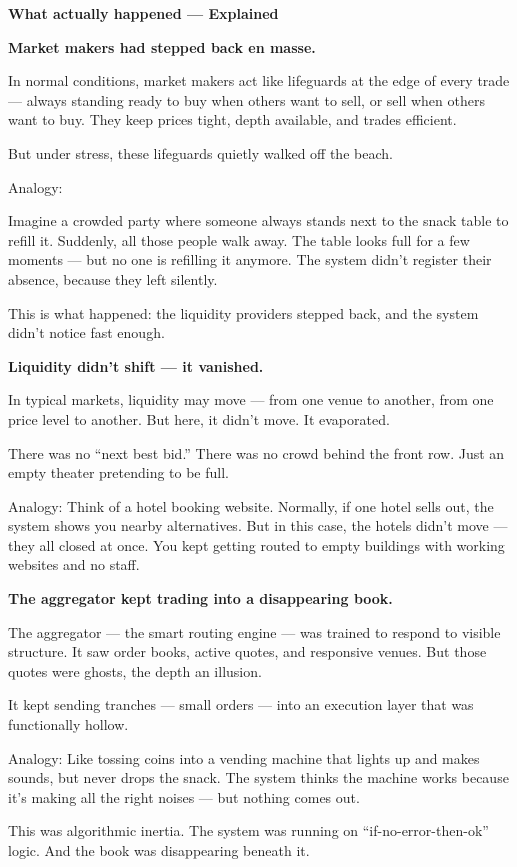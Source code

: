 \textbf{What actually happened — Explained}

\textbf{Market makers had stepped back en masse.}

In normal conditions, market makers act like lifeguards at the edge of every trade — always standing ready to 
buy when others want to sell, or sell when others want to buy. They keep prices tight, depth available, and 
trades efficient.

But under stress, these lifeguards quietly walked off the beach.

Analogy:

Imagine a crowded party where someone always stands next to the snack table to refill it. Suddenly, all those 
people walk away. The table looks full for a few moments — but no one is refilling it anymore. The system didn't 
register their absence, because they left silently.

This is what happened: the liquidity providers stepped back, and the system didn’t notice fast enough.


\textbf{Liquidity didn’t shift — it vanished.}

In typical markets, liquidity may move — from one venue to another, from one price level to another. But here, 
it didn’t move. It evaporated.

There was no “next best bid.” There was no crowd behind the front row. Just an empty theater pretending to be 
full.

Analogy:
Think of a hotel booking website. Normally, if one hotel sells out, the system shows you nearby alternatives. 
But in this case, the hotels didn’t move — they all closed at once. You kept getting routed to empty buildings 
with working websites and no staff.

\textbf{The aggregator kept trading into a disappearing book.}

The aggregator — the smart routing engine — was trained to respond to visible structure. It saw order books, 
active quotes, and responsive venues. But those quotes were ghosts, the depth an illusion.

It kept sending tranches — small orders — into an execution layer that was functionally hollow.

Analogy:
Like tossing coins into a vending machine that lights up and makes sounds, but never drops the snack. The system 
thinks the machine works because it’s making all the right noises — but nothing comes out.

This was algorithmic inertia. The system was running on “if-no-error-then-ok” logic. And the book was disappearing 
beneath it.


